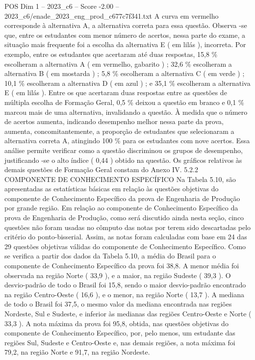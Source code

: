 \begin{textsample}{POS Dim 1 – 2023\_c6 – Score -2.00 – 2023\_c6/enade\_2023\_eng\_prod\_c677c7f341.txt}
A curva em vermelho corresponde à alternativa A, a alternativa correta para essa questão.
Observa -se que, entre os estudantes com menor número de acertos, nessa parte do exame, a situação mais frequente foi a escolha da alternativa E ( em lilás ), incorreta.
Por exemplo, entre os estudantes que acertaram até duas respostas, 15,8 \% escolheram a alternativa A ( em vermelho, gabarito ) ; 32,6 \% escolheram a alternativa B ( em mostarda ) ; 5,8 \% escolheram a alternativa C ( em verde ) ; 10,1 \% escolheram a alternativa D ( em azul ) ; e 35,1 \% escolheram a alternativa E ( em lilás ).
Entre os que acertaram duas respostas entre as questões de múltipla escolha de Formação Geral, 0,5 \% deixou a questão em branco e 0,1 \% marcou mais de uma alternativa, invalidando a questão.
À medida que o número de acertos aumenta, indicando desempenho melhor nessa parte da prova, aumenta, concomitantemente, a proporção de estudantes que selecionaram a alternativa correta A, atingindo 100 \% para os estudantes com nove acertos.
Essa análise permite verificar como a questão discriminou os grupos de desempenho, justificando -se o alto índice ( 0,44 ) obtido na questão.
Os gráficos relativos às demais questões de Formação Geral constam do Anexo IV. 5.2.2 COMPONENTE DE CONHECIMENTO ESPECÍFICO Na Tabela 5.10, são apresentadas as estatísticas básicas em relação às questões objetivas do componente de Conhecimento Específico da prova de Engenharia de Produção por grande região.
Em relação ao componente de Conhecimento Específico da prova de Engenharia de Produção, como será discutido ainda nesta seção, cinco questões não foram usadas no cômputo das notas por terem sido descartadas pelo critério do ponto-bisserial.
Assim, as notas foram calculadas com base em 24 das 29 questões objetivas válidas do componente de Conhecimento Específico.
Como se verifica a partir dos dados da Tabela 5.10, a média do Brasil para o componente de Conhecimento Específico da prova foi 38,8.
A menor média foi observada na região Norte ( 33,9 ), e a maior, na região Sudeste ( 39,3 ).
O desvio-padrão de todo o Brasil foi 15,8, sendo o maior desvio-padrão encontrado na região Centro-Oeste ( 16,6 ), e o menor, na região Norte ( 13,7 ).
A mediana de todo o Brasil foi 37,5, o mesmo valor da mediana encontrada nas regiões Nordeste, Sul e Sudeste, e inferior às medianas das regiões Centro-Oeste e Norte ( 33,3 ).
A nota máxima da prova foi 95,8, obtida, nas questões objetivas do componente de Conhecimento Específico, por, pelo menos, um estudante das regiões Sul, Sudeste e Centro-Oeste e, nas demais regiões, a nota máxima foi 79,2, na região Norte e 91,7, na região Nordeste.

\end{textsample}
